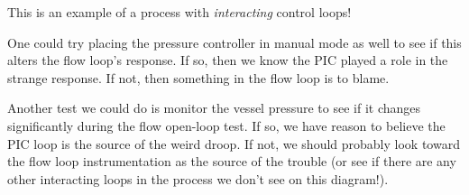 





This is an example of a process with {\it interacting} control loops!







One could try placing the pressure controller in manual mode as well to see if this alters the flow loop's response.  If so, then we know the PIC played a role in the strange response.  If not, then something in the flow loop is to blame.

Another test we could do is monitor the vessel pressure to see if it changes significantly during the flow open-loop test.  If so, we have reason to believe the PIC loop is the source of the weird droop.  If not, we should probably look toward the flow loop instrumentation as the source of the trouble (or see if there are any other interacting loops in the process we don't see on this diagram!).




